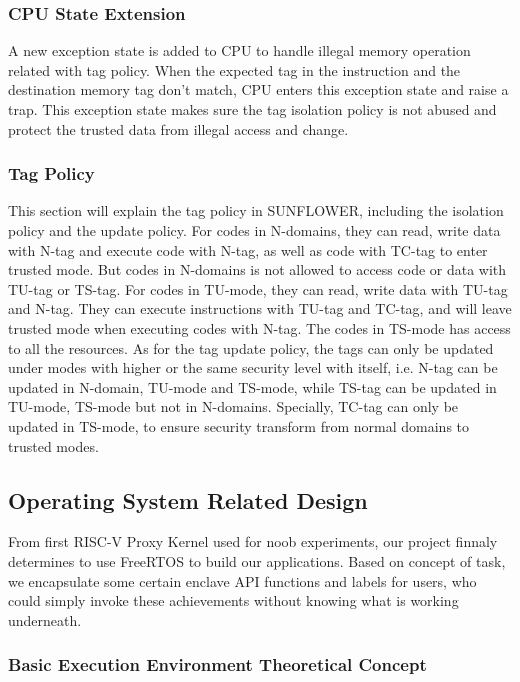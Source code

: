 \documentclass[conference]{IEEEtran}
\begin{document}
\subsubsection{CPU State Extension}
A new exception state is added to CPU to handle illegal memory operation related with tag policy. When the expected tag in the instruction and the destination memory tag don't match, CPU enters this exception state and raise a trap. This exception state makes sure the tag isolation policy is not abused and protect the trusted data from illegal access and change. 

\subsubsection{Tag Policy}
This section will explain the tag policy in SUNFLOWER, including the isolation policy and the update policy. For codes in N-domains, they can read, write data with N-tag and execute code with N-tag, as well as code with TC-tag to enter trusted mode. But codes in N-domains is not allowed to access code or data with TU-tag or TS-tag. For codes in TU-mode, they can read, write data with TU-tag and N-tag. They can execute instructions with TU-tag and TC-tag, and will leave trusted mode when executing codes with N-tag. The codes in TS-mode has access to all the resources. As for the tag update policy, the tags can only be updated under modes with higher or the same security level with itself, i.e. N-tag can be updated in N-domain, TU-mode and TS-mode, while TS-tag can be updated in TU-mode, TS-mode but not in N-domains. Specially, TC-tag can only be updated in TS-mode, to ensure security transform from normal domains to trusted modes. 


\subsection{Operating System Related Design}

From first RISC-V Proxy Kernel used for noob experiments, our project finnaly determines to use FreeRTOS to build our applications. Based on concept of task, we encapsulate some certain enclave API functions and labels for users, who could simply invoke these achievements without knowing what is working underneath. 

\subsubsection{Basic Execution Environment Theoretical Concept}
\end{document}
